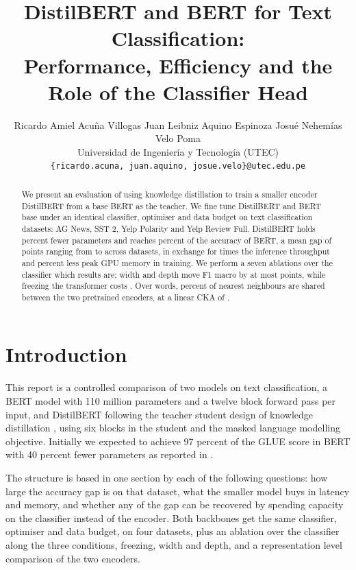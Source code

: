 \documentclass{article}
\title{DistilBERT and BERT for Text Classification:\\ Performance, Efficiency and the Role of the Classifier Head}
\author{%
  Ricardo Amiel Acu\~na Villogas \quad Juan Leibniz Aquino Espinoza \quad Josu\'e Nehem\'ias Velo Poma \\
  Universidad de Ingenier\'ia y Tecnolog\'ia (UTEC) \\
  \texttt{\{ricardo.acuna, juan.aquino, josue.velo\}@utec.edu.pe}
}
\begin{document}
\maketitle

\begin{abstract}
We present an evaluation of using knowledge distillation to train a smaller encoder DistilBERT from a base BERT as the teacher. We fine tune DistilBERT and BERT base under an identical classifier, optimiser and data budget on \nDatasets{} text classification datasets: AG News, SST 2, Yelp Polarity and Yelp Review Full. DistilBERT holds \paramReduction{} percent fewer parameters and reaches \accRetention{} percent of the accuracy of BERT, a mean gap of \meanAccGap{} points ranging from \minAccGap{} to \maxAccGap{} across datasets, in exchange for \throughputSpeedup{} times the inference throughput and \memReduction{} percent less peak GPU memory in training. We perform a seven ablations over the classifier which results are: width and depth move F1 macro by at most \headSpread{} points, while freezing the transformer costs \frozenGap{}. Over \nWords{} words, \wordOverlapPct{} percent of nearest neighbours are shared between the two pretrained encoders, at a linear CKA of \wordCka{}. 
\end{abstract}

\section{Introduction}

This report is a controlled comparison of two models on text classification, a BERT \citep{devlin2019bert} model with 110 million parameters and a twelve block forward pass per input, and DistilBERT \citep{sanh2019distilbert} following the teacher student design of knowledge distillation \citep{hinton2015distilling}, using six blocks in the student and the masked language modelling objective. Initially we expected to achieve 97 percent of the GLUE score in BERT with 40 percent fewer parameters as reported in \citep{wang2018glue}.

The structure is based in one section by each of the following questions: how large the accuracy gap is on that dataset, what the smaller model buys in latency and memory, and whether any of the gap can be recovered by spending capacity on the classifier instead of the encoder. Both backbones get the same classifier, optimiser and data budget, on four datasets, plus an ablation over the classifier along the three conditions, freezing, width and depth, and a representation level comparison of the two encoders.
\end{document}
